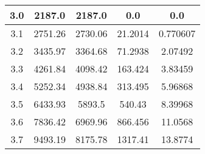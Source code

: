 \begin{table}[h!]
\begin{tabular}{|c|c|c|c|c|}
        3.0        & 2187.0  & 2187.0                              & 0.0           & 0.0                   \\ \hline
        3.1        & 2751.26 & 2730.06                             & 21.2014       & 0.770607              \\ \hline
        3.2        & 3435.97 & 3364.68                             & 71.2938       & 2.07492               \\ \hline
        3.3        & 4261.84 & 4098.42                             & 163.424       & 3.83459               \\ \hline
        3.4        & 5252.34 & 4938.84                             & 313.495       & 5.96868               \\ \hline
        3.5        & 6433.93 & 5893.5                              & 540.43        & 8.39968               \\ \hline
        3.6        & 7836.42 & 6969.96                             & 866.456       & 11.0568               \\ \hline
        3.7        & 9493.19 & 8175.78                             & 1317.41       & 13.8774               \\ \hline
    \end{tabular}\label{tab:table6}
\end{table}
